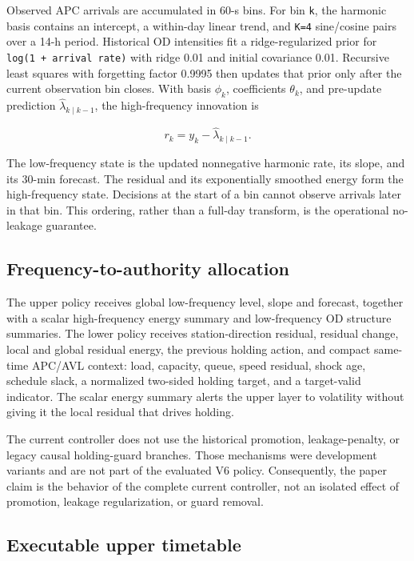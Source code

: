 \documentclass[preprint,12pt,authoryear,nopreprintline]{elsarticle}
\begin{document}
Observed APC arrivals are accumulated in 60-s bins. For bin \texttt{k},
the harmonic basis contains an intercept, a within-day linear trend, and
\texttt{K=4} sine/cosine pairs over a 14-h period. Historical OD
intensities fit a ridge-regularized prior for
\texttt{log(1\ +\ arrival\ rate)} with ridge 0.01 and initial covariance
0.01. Recursive least squares with forgetting factor 0.9995 then updates
that prior only after the current observation bin closes. With basis
\(\phi_k\), coefficients \(\theta_k\), and pre-update prediction
\(\widehat{\lambda}_{k\mid k-1}\), the high-frequency innovation is

\[r_k = y_k - \widehat{\lambda}_{k\mid k-1}.\]

The low-frequency state is the updated nonnegative harmonic rate, its
slope, and its 30-min forecast. The residual and its exponentially
smoothed energy form the high-frequency state. Decisions at the start of
a bin cannot observe arrivals later in that bin. This ordering, rather
than a full-day transform, is the operational no-leakage guarantee.

\subsection{Frequency-to-authority
allocation}\label{frequency-to-authority-allocation}

The upper policy receives global low-frequency level, slope and
forecast, together with a scalar high-frequency energy summary and
low-frequency OD structure summaries. The lower policy receives
station-direction residual, residual change, local and global residual
energy, the previous holding action, and compact same-time APC/AVL
context: load, capacity, queue, speed residual, shock age, schedule
slack, a normalized two-sided holding target, and a target-valid
indicator. The scalar energy summary alerts the upper layer to
volatility without giving it the local residual that drives holding.

The current controller does not use the historical promotion,
leakage-penalty, or legacy causal holding-guard branches. Those
mechanisms were development variants and are not part of the evaluated
V6 policy. Consequently, the paper claim is the behavior of the complete
current controller, not an isolated effect of promotion, leakage
regularization, or guard removal.

\subsection{Executable upper
timetable}\label{executable-upper-timetable}
\end{document}
